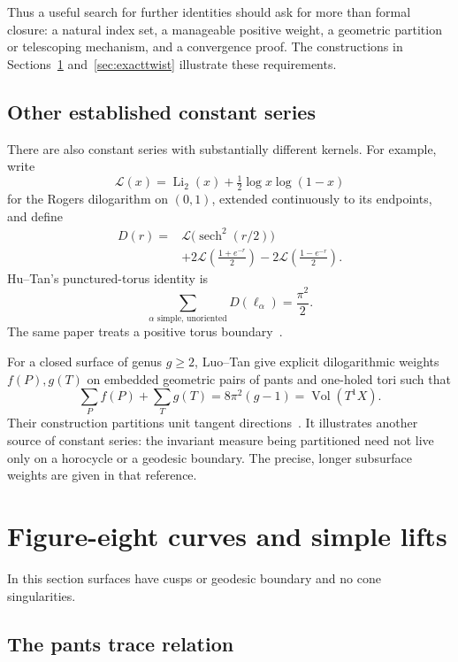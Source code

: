 \documentclass[11pt,a4paper]{article}
\numberwithin{equation}{section}
\theoremstyle{definition}
\theoremstyle{remark}
\DeclareMathOperator{\sech}{sech}
\begin{document}
Thus a useful search for further identities should ask for more than
formal closure: a natural index set, a manageable positive weight, a
geometric partition or telescoping mechanism, and a convergence proof.
The constructions in Sections~\ref{sec:figures} and~\ref{sec:exacttwist}
illustrate these requirements.

\subsection{Other established constant series}

There are also constant series with substantially different kernels.
For example, write
\[
 \mathcal L(x)=\operatorname{Li}_2(x)+\tfrac12\log x\log(1-x)
\]
for the Rogers dilogarithm on $(0,1)$, extended continuously to its
endpoints, and define
\begin{align*}
 D(r)={}&\mathcal L\bigl(\sech^2(r/2)\bigr)\\
 &+2\mathcal L\left(\frac{1+e^{-r}}2\right)
  -2\mathcal L\left(\frac{1-e^{-r}}2\right).
\end{align*}
Hu--Tan's punctured-torus identity is
\begin{equation}
 \sum_{\alpha\text{ simple, unoriented}}D(\ell_\alpha)=\frac{\pi^2}{2}.
 \label{eq:dilogtorus}
\end{equation}
The same paper treats a positive torus boundary~\cite[Theorems 1--2]{HuTan}.

For a closed surface of genus $g\ge2$, Luo--Tan give explicit dilogarithmic
weights $f(P),g(T)$ on embedded geometric pairs of pants and one-holed tori
such that
\begin{equation}
 \sum_P f(P)+\sum_T g(T)=8\pi^2(g-1)=\operatorname{Vol}(T^1X).
 \label{eq:luotan}
\end{equation}
Their construction partitions unit tangent directions~\cite{LuoTan}.
It illustrates another source of constant series: the invariant measure
being partitioned need not live only on a horocycle or a geodesic boundary.
The precise, longer subsurface weights are given in that reference.

\section{Figure-eight curves and simple lifts}
\label{sec:figures}

In this section surfaces have cusps or geodesic boundary and no cone
singularities.

\subsection{The pants trace relation}
\end{document}
